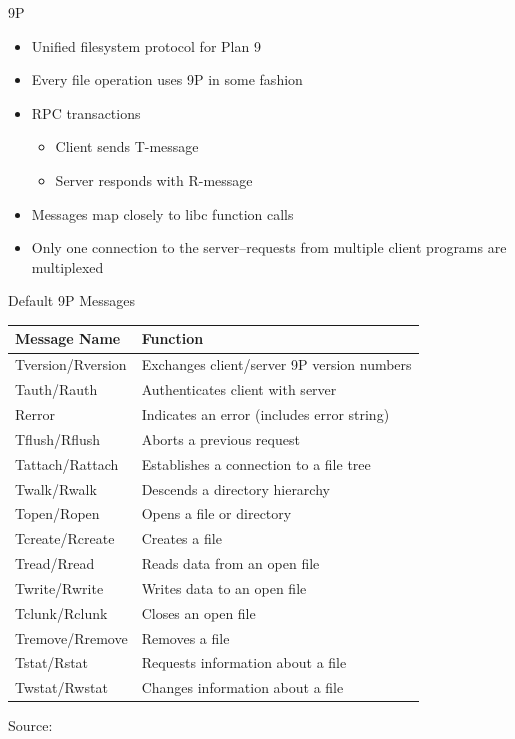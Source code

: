 \documentclass[11pt,compress]{beamer}
\begin{document}
\begin{frame}{9P}
\begin{itemize}
	\item Unified filesystem protocol for Plan 9\cite{Pike95:PBL}
	\item Every file operation uses 9P in some fashion
	\item RPC transactions
	\begin{itemize}
		\item Client sends T-message
		\item Server responds with R-message
	\end{itemize}
	\item Messages map closely to libc function calls
	\item Only one connection to the server--requests from multiple client programs are multiplexed
\end{itemize}
\end{frame}

\begin{frame}{Default 9P Messages}
\begin{table}[h]
\begin{center}
	\begin{tabular}{ | l | l | }
		\hline
		\bf{Message Name} & \bf{Function} \\ \hline
		Tversion/Rversion & Exchanges client/server 9P version numbers \\ \hline
		Tauth/Rauth & Authenticates client with server \\ \hline
		Rerror & Indicates an error (includes error string) \\ \hline
		Tflush/Rflush & Aborts a previous request \\ \hline
		Tattach/Rattach & Establishes a connection to a file tree \\ \hline
		Twalk/Rwalk & Descends a directory hierarchy \\ \hline
		Topen/Ropen & Opens a file or directory \\ \hline
		Tcreate/Rcreate & Creates a file \\ \hline
		Tread/Rread & Reads data from an open file \\ \hline
		Twrite/Rwrite & Writes data to an open file \\ \hline
		Tclunk/Rclunk & Closes an open file \\ \hline
		Tremove/Rremove & Removes a file \\ \hline
		Tstat/Rstat & Requests information about a file \\ \hline
		Twstat/Rwstat & Changes information about a file \\ \hline
	\end{tabular}
\end{center}
\footnotesize Source: \cite{5intro}
\end{table}
\end{frame}
\end{document}
